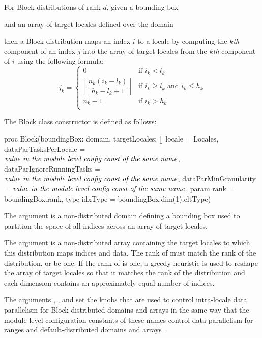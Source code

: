 For Block distributions of rank $d$, given a bounding box
\begin{chapel}
[$l_1$..$h_1$, $\ldots$, $l_d$..$h_d$]
\end{chapel}
and an array of target locales defined over the domain
\begin{chapel}
[$0$..$n_1$-1, $\ldots$, $0$..$n_d-1$]
\end{chapel}
then a Block distribution maps an index $i$ to a locale by computing
the $k$\emph{th} component of an index $j$ into the array of target
locales from the $k$\emph{th} component of $i$ using the following
formula:
\[
j_k = \left\{
  \begin{array}{ll}
    0 & \mbox{if $i_k < l_k$} \\
    \left\lfloor\dfrac{n_k (i_k - l_k)}{h_k - l_k + 1}\right\rfloor & \mbox{if $i_k \geq l_k$ and $i_k \leq h_k$} \\
    n_k-1 & \mbox{if $i_k > h_k$} \\
  \end{array}
\right.
\]

The Block class constructor is defined as follows:
\begin{chapel}
proc Block(boundingBox: domain,
          targetLocales: [] locale = Locales, 
          dataParTasksPerLocale = $\mbox{{\it value in the module level config const of the same name}}$,
          dataParIgnoreRunningTasks = $\mbox{{\it value in the module level config const of the same name}}$,
          dataParMinGranularity = $\mbox{{\it value in the module level config const of the same name}}$,
          param rank = boundingBox.rank,
          type idxType = boundingBox.dim(1).eltType)
\end{chapel}

The argument  is a non-distributed domain defining a
bounding box used to partition the space of all indices across an
array of target locales.

The argument  is a non-distributed array
containing the target locales to which this distribution maps indices
and data.  The rank of  must match the rank of the
distribution, or be one.  If the rank of
 is one, a greedy heuristic is used to reshape the
array of target locales so that it matches the rank of the
distribution and each dimension contains an approximately equal number
of indices.

The
arguments , ,
and  set the knobs that are used to
control intra-locale data parallelism for Block-distributed domains
and arrays in the same way that the module level configuration constants of
these names control data parallelism for ranges and
default-distributed domains and arrays~.

